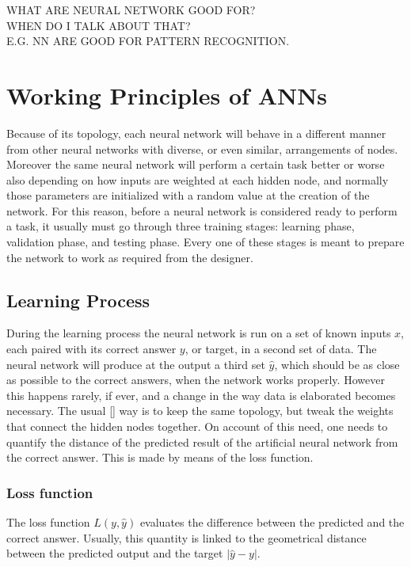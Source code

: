 \noindent\uppercase{\large{What are neural network good for?\\ when do i talk about that?\\ e.g. NN are good for pattern recognition.}}
\normalsize

\section{Working Principles of ANNs}
\label{sec:Working_Principles_of_ANNs}
Because of its topology, each neural network will behave in a different manner from other neural networks with diverse, or even similar, arrangements of nodes.
Moreover the same neural network will perform a certain task better or worse also depending on how inputs are weighted at each hidden node, and normally those parameters are initialized with a random value at the creation of the network.
For this reason, before a neural network is considered ready to perform a task, it usually must go through three training stages: learning phase, validation phase, and testing phase.
Every one of these stages is meant to prepare the network to work as required from the designer.

\subsection{Learning Process}
\label{ssec:Learning_Process}
During the learning process the neural network is run on a set of known inputs $x$, each paired with its correct answer $y$, or target, in a second set of data.
The neural network will produce at the output a third set $\hat{y}$, which should be as close as possible to the correct answers, when the network works properly.
However this happens rarely, if ever, and a change in the way data is elaborated becomes necessary.
The usual \ref{} way is to keep the same topology, but tweak the weights that connect the hidden nodes together.
On account of this need, one needs to quantify the distance of the predicted result of the artificial neural network from the correct answer.
This is made by means of the loss function.

\subsubsection{Loss function}
\label{sssec:Loss_function}
The loss function $L(y, \hat{y})$ evaluates the difference between the predicted and the correct answer.
Usually, this quantity is linked to the geometrical distance between the predicted output and the target $\left| \hat{y}-y \right|$.


